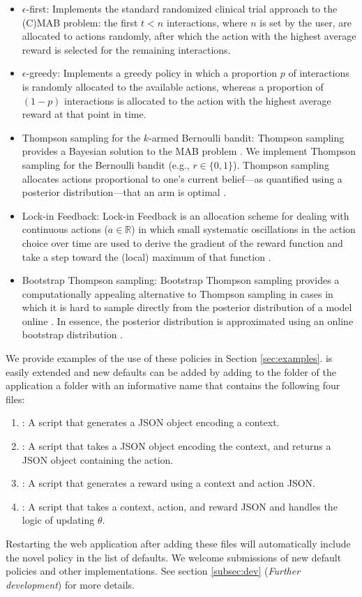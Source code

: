 \documentclass[nojss]{jss}
\begin{document}
\begin{itemize}
\item $\epsilon$-first: Implements the standard randomized clinical trial approach to the (C)MAB problem: the first $t < n$ interactions, where $n$ is set by the user, are allocated to actions randomly, after which the action with the highest average reward is selected for the remaining interactions.
\item $\epsilon$-greedy: Implements a greedy policy in which a proportion $p$ of interactions is randomly allocated to the available actions, whereas a proportion of $(1-p)$ interactions is allocated to the action with the highest average reward at that point in time.
\item Thompson sampling for the $k$-armed Bernoulli bandit: Thompson sampling provides a Bayesian solution to the MAB problem \citep{thompson1933likelihood, Agrawal2011}. We implement Thompson sampling for the Bernoulli bandit (e.g., $r \in \{0, 1\}$). Thompson sampling allocates actions proportional to one's current belief---as quantified using a posterior distribution---that an arm is optimal \citep{Kaptein2014a}. 
\item Lock-in Feedback: Lock-in Feedback is an allocation scheme for dealing with continuous actions ($a \in \mathbb{R}$) in which small systematic oscillations in the action choice over time are used to derive the gradient of the reward function and take a step toward the (local) maximum of that function \citep[see][for details]{kaptein2016tracking, kaptein2016investigation}.
\item Bootstrap Thompson sampling: Bootstrap Thompson sampling provides a computationally appealing alternative to Thompson sampling in cases in which it is hard to sample directly from the posterior distribution of a model online \citep[see][]{Kaptein}. In essence, the posterior distribution is approximated using an online bootstrap distribution \citep{Owen2012}.
\end{itemize}
We provide examples of the use of these policies in Section \ref{sec:examples}.  is easily extended and new defaults can be added by adding to the  folder of the application a folder with an informative name that contains the following four files:
\begin{enumerate}
\item {}: A  script that generates a JSON object encoding a context. 
\item {}: A script that takes a JSON object encoding the context, and returns a JSON object containing the action.
\item {}: A script that generates a reward using a context and action JSON.
\item {}: A script that takes a context, action, and reward JSON and handles the logic of updating $\theta$.
\end{enumerate}
Restarting the web application after adding these files will automatically include the novel policy in the list of defaults. We welcome submissions of new default policies and other implementations. See section \ref{subsec:dev} (\textit{Further development}) for more details.
\end{document}
